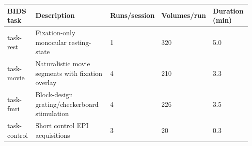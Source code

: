 \documentclass[11pt]{article}
\begin{document}
\pagestyle{empty}
\vspace*{0pt}
\begin{center}
\setlength{\tabcolsep}{5pt}
\renewcommand{\arraystretch}{1.30}
\begin{minipage}{0.98\textwidth}
\centering
\begin{tabularx}{\textwidth}{@{}L{2.6cm}Y C{2.2cm} C{2.2cm} C{2.4cm}@{}}
\toprule
\textcolor{headergray}{\textbf{BIDS task}} &
\textcolor{headergray}{\textbf{Description}} &
\textcolor{headergray}{\textbf{Runs/session}} &
\textcolor{headergray}{\textbf{Volumes/run}} &
\textcolor{headergray}{\textbf{Duration (min)}} \\
\midrule
{\ttfamily task-rest} & Fixation-only monocular resting-state & 1 & 320 & 5.0 \\
 {\ttfamily task-movie} & Naturalistic movie segments with fixation overlay & 4 & 210 & 3.3 \\
{\ttfamily task-fmri} & Block-design grating/checkerboard stimulation & 4 & 226 & 3.5 \\
 {\ttfamily task-control} & Short control EPI acquisitions & 3 & 20 & 0.3 \\
\bottomrule
\end{tabularx}
\end{minipage}
\end{center}
\end{document}

